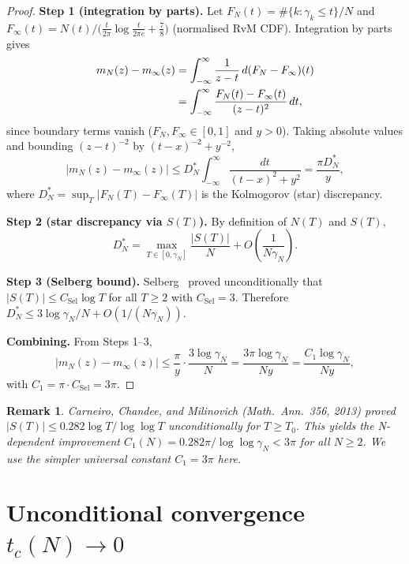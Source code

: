 \documentclass[11pt,reqno]{amsart}
\newtheorem{remark}[theorem]{Remark}
\newcommand{\tc}{t_c}
\newcommand{\mN}{m_N}
\newcommand{\minf}{m_\infty}
\newcommand{\gN}{\gamma_N}
\begin{document}
\begin{proof}
\textbf{Step 1 (integration by parts).}
Let $F_N(t) = \#\{k : \gamma_k \leq t\}/N$ and
$F_\infty(t) = N(t)/\bigl(\frac{t}{2\pi}\log\frac{t}{2\pi e} + \frac78\bigr)$
(normalised RvM CDF).  Integration by parts gives
\begin{align}
  \mN(z) - \minf(z) &= \int_{-\infty}^{\infty} \frac{1}{z-t}\,d(F_N - F_\infty)(t)
  \notag\\
  &= \int_{-\infty}^{\infty} \frac{F_N(t) - F_\infty(t)}{(z-t)^2}\,dt,
\end{align}
since boundary terms vanish ($F_N, F_\infty \in [0,1]$ and $y > 0$).
Taking absolute values and bounding $(z-t)^{-2}$ by $(t-x)^{-2}+y^{-2}$,
\begin{equation}
  |\mN(z) - \minf(z)| \leq D_N^* \int_{-\infty}^{\infty} \frac{dt}{(t-x)^2 + y^2}
  = \frac{\pi D_N^*}{y},
\end{equation}
where $D_N^* = \sup_T |F_N(T) - F_\infty(T)|$ is the Kolmogorov (star) discrepancy.

\textbf{Step 2 (star discrepancy via $S(T)$).}
By definition of $N(T)$ and $S(T)$,
\begin{equation}
  D_N^* = \max_{T \in [0,\gN]} \frac{|S(T)|}{N} + O\!\left(\frac{1}{N\gN}\right).
\end{equation}

\textbf{Step 3 (Selberg bound).}
Selberg~\cite{titchmarsh86} proved unconditionally that
$|S(T)| \leq C_{\mathrm{Sel}} \log T$ for all $T \geq 2$
with $C_{\mathrm{Sel}} = 3$.
Therefore $D_N^* \leq 3\log\gN / N + O(1/(N\gN))$.

\textbf{Combining.} From Steps 1--3,
\begin{equation}
  |\mN(z) - \minf(z)| \leq \frac{\pi}{y} \cdot \frac{3\log\gN}{N}
  = \frac{3\pi\log\gN}{Ny} = \frac{C_1\log\gN}{Ny},
\end{equation}
with $C_1 = \pi \cdot C_{\mathrm{Sel}} = 3\pi$.
\end{proof}

\begin{remark}
Carneiro, Chandee, and Milinovich (Math.\ Ann.\ 356, 2013) proved
$|S(T)| \leq 0.282 \log T / \log\log T$ unconditionally for $T \geq T_0$.
This yields the N-dependent improvement $C_1(N) = 0.282\pi/\log\log\gN < 3\pi$
for all $N \geq 2$.  We use the simpler universal constant $C_1 = 3\pi$ here.
\end{remark}

\section{Unconditional convergence $\tc(N)\to 0$}\label{sec:tc}
\end{document}
